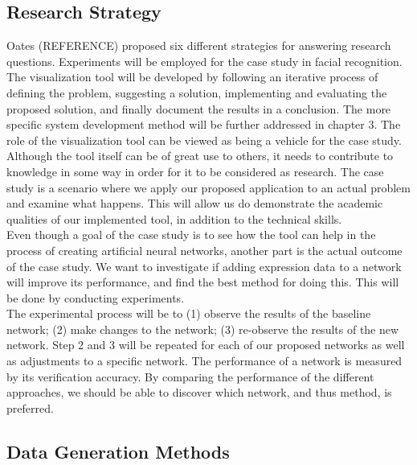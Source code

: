 \subsection{Research Strategy}

\noindent Oates (REFERENCE) proposed six different strategies for answering research questions. Experiments will be employed for the case study in facial recognition. \\

\noindent The visualization tool will be developed by following an iterative process of defining the problem, suggesting a solution, implementing and evaluating the proposed solution, and finally document the results in a conclusion. The more specific system development method will be further addressed in chapter 3. The role of the visualization tool can be viewed as being a vehicle for the case study. Although the tool itself can be of great use to others, it needs to contribute to knowledge in some way in order for it to be considered as research. The case study is a scenario where we apply our proposed application to an actual problem and examine what happens. This will allow us do demonstrate the academic qualities of our implemented tool, in addition to the technical skills. \\

\noindent Even though a goal of the case study is to see how the tool can help in the process of creating artificial neural networks, another part is the actual outcome of the case study. We want to investigate if adding expression data to a network will improve its performance, and find the best method for doing this. This will be done by conducting experiments. \\

\noindent The experimental process will be to (1) observe the results of the baseline network; (2) make changes to the network; (3) re-observe the results of the new network. Step 2 and 3 will be repeated for each of our proposed networks as well as adjustments to a specific network. The performance of a network is measured by its verification accuracy. By comparing the performance of the different approaches, we should be able to discover which network, and thus method, is preferred. \\

\subsection{Data Generation Methods}

